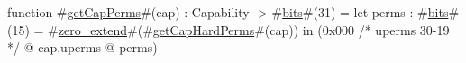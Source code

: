 function #\hyperref[sailMIPSzgetCapPerms]{getCapPerms}#(cap) : Capability -> #\hyperref[sailMIPSzbits]{bits}#(31) =
    let perms : #\hyperref[sailMIPSzbits]{bits}#(15) = #\hyperref[sailMIPSzzzerozyextend]{zero\_extend}#(#\hyperref[sailMIPSzgetCapHardPerms]{getCapHardPerms}#(cap)) in
    (0x000 /* uperms 30-19 */
  @ cap.uperms
  @ perms)
